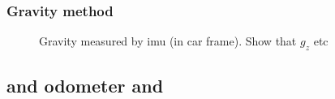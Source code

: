 \subsubsection{Gravity method}
\begin{figure}[htpb]
    \centering
    
    \caption{Gravity measured by \acrshort{imu} (in car frame). Show that $g_z$ etc}
    \label{fig:tikz_car_gravity}
\end{figure}


\subsection{ and odometer and }
